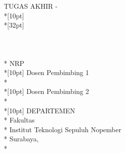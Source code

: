 \newpage

	\sffamily
	\thispagestyle{empty}
	{ \noindent TUGAS AKHIR - \kode }\\*[10pt] 
	{\large\textbf{\MakeUppercase{\judul}}} \\*[32pt]
	\\
	\\
	\\
	\MakeUppercase{\penulis} \\*
	NRP \nrp \\*[10pt]
	Dosen Pembimbing 1 \\*
	\pembimbingSatu \\*[10pt]
	Dosen Pembimbing 2 \\*
	\pembimbingDua \\*[10pt]
	DEPARTEMEN \MakeUppercase{\jurusan} \\*
	Fakultas \fakultas \\*
	Institut Teknologi Sepuluh Nopember \\*
	Surabaya, \tahun \\*
	\rmfamily
	\normalsize
	\restoregeometry
	\color{black}
	\cleardoublepage

